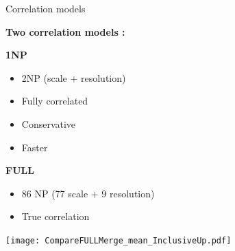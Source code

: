 \begin{frame}{Correlation models }
  \begin{center}{\bf Two correlation models : } \end{center}
  \begin{minipage}[t]{0.49\linewidth}
    {\bf 1NP }
    \begin{itemize}
    \item 2NP (scale + resolution)
    \item Fully correlated
    \item Conservative
    \item Faster
    \end{itemize}
  \end{minipage}
  \hfill
  \begin{minipage}[t]{0.49\linewidth}
    {\bf FULL}
    \begin{itemize}
    \item 86 NP (77 scale + 9 resolution)
    \item True correlation
    \end{itemize}
  \end{minipage}
  
  \begin{minipage}{0.49\linewidth}
  \end{minipage}
  \hfill
  \begin{minipage}{0.49\linewidth}
    \texttt{[image: CompareFULLMerge\_mean\_InclusiveUp.pdf]}
  \end{minipage}

\end{frame}
